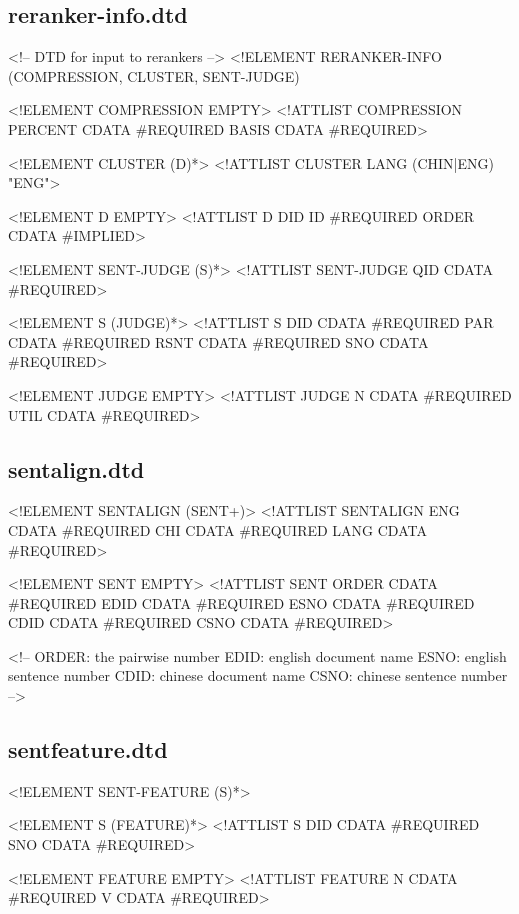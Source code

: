 \documentclass[10pt]{article}
\begin{document}
\subsection{reranker-info.dtd}
\begin{center}
\begin{boxedverbatim}
<!-- DTD for input to rerankers -->
<!ELEMENT RERANKER-INFO (COMPRESSION, CLUSTER, SENT-JUDGE)

<!ELEMENT COMPRESSION EMPTY>
<!ATTLIST COMPRESSION
    PERCENT CDATA #REQUIRED
    BASIS   CDATA #REQUIRED>

<!ELEMENT CLUSTER (D)*>
<!ATTLIST CLUSTER
    LANG (CHIN|ENG) "ENG">

<!ELEMENT D EMPTY>
<!ATTLIST D
    DID   ID    #REQUIRED
    ORDER CDATA #IMPLIED>

<!ELEMENT SENT-JUDGE (S)*>
<!ATTLIST SENT-JUDGE
    QID  CDATA  #REQUIRED>

<!ELEMENT S (JUDGE)*>
<!ATTLIST S
    DID  CDATA #REQUIRED
    PAR  CDATA #REQUIRED
    RSNT CDATA #REQUIRED
    SNO  CDATA #REQUIRED>

<!ELEMENT JUDGE EMPTY>
<!ATTLIST JUDGE
    N    CDATA #REQUIRED
    UTIL CDATA #REQUIRED>
\end{boxedverbatim}
\end{center}



\subsection{sentalign.dtd}
\begin{center}
\begin{boxedverbatim}
<!ELEMENT SENTALIGN (SENT+)>
<!ATTLIST SENTALIGN
   ENG         CDATA #REQUIRED
   CHI         CDATA #REQUIRED
   LANG        CDATA #REQUIRED>

<!ELEMENT SENT EMPTY>
<!ATTLIST SENT
   ORDER       CDATA #REQUIRED
   EDID        CDATA #REQUIRED
   ESNO        CDATA #REQUIRED
   CDID        CDATA #REQUIRED
   CSNO        CDATA #REQUIRED>

<!-- ORDER: the pairwise number
     EDID:  english document name
     ESNO:  english sentence number
     CDID:  chinese document name
     CSNO:  chinese sentence number -->
\end{boxedverbatim}
\end{center}



\subsection{sentfeature.dtd}
\begin{center}
\begin{boxedverbatim}
<!ELEMENT SENT-FEATURE (S)*>

<!ELEMENT S (FEATURE)*>
<!ATTLIST S
    DID  CDATA #REQUIRED
    SNO  CDATA #REQUIRED>

<!ELEMENT FEATURE EMPTY>
<!ATTLIST FEATURE
    N CDATA #REQUIRED
    V CDATA #REQUIRED>
\end{boxedverbatim}
\end{center}
\end{document}
